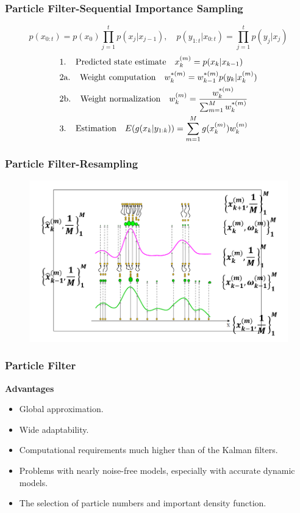 \documentclass[14pt,hyperref={CJKbookmarks=true}]{beamer}
\theoremstyle{plain}
\theoremstyle{definition}
\theoremstyle{remark}
\begin{document}
\begin{frame}
\small \frametitle{Particle Filter-Sequential Importance Sampling}
\begin{equation*}
p(x_{0:t})=p(x_0)\prod_{j=1}^{t}p(x_j|x_{j-1}), \quad p(y_{1:t}|x_{0:t})=\prod_{j=1}^{t}p(y_j|x_{j})
\end{equation*}
\begin{equation*}
\begin{split}
&\text{1. \: Predicted state estimate}\quad x_k^{(m)} =p(x_k|x_{k-1}) \\
&\text{2a. \: Weight computation} \quad w_k^{*(m)} =w_{k-1}^{*(m)} p(y_k|x_k^{(m)}) \\
&\text{2b. \: Weight normalization} \quad w_k^{(m)} =\frac {w_{k}^{*(m)}}{\sum _{m=1}^{M}w_{k}^{*(m)}} \\
&\text{3. \: Estimation} \quad E(g(x_k|y_{1:k}))=\sum_{m=1}^{M}g(x_k^{(m)})w_k^{(m)} \\
\end{split}
\end{equation*}
\end{frame}

\begin{frame}
\small \frametitle{Particle Filter-Resampling}
\begin{figure}
\centering
\includegraphics[width=1\linewidth]{resampling.png}
\end{figure}
\end{frame}

\begin{frame}
\small \frametitle{Particle Filter}{} \small {\bf{Advantages}}
\begin{itemize}
\item Global approximation.
\item Wide adaptability.
\end{itemize}
\begin{itemize}
\item Computational requirements much higher than of the Kalman filters.
\item Problems with nearly noise-free models, especially with accurate dynamic models.
\item The selection of particle numbers and important density function. 
\end{itemize}
\end{frame}
\end{document}
